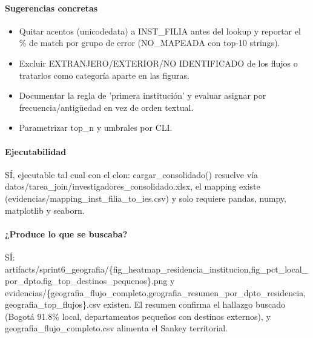 \paragraph{Sugerencias concretas}
\begin{itemize}
  \item Quitar acentos (unicodedata) a INST\_FILIA antes del lookup y reportar el \% de match por grupo de error (NO\_MAPEADA con top-10 strings).
  \item Excluir EXTRANJERO/EXTERIOR/NO IDENTIFICADO de los flujos o tratarlos como categoría aparte en las figuras.
  \item Documentar la regla de 'primera institución' y evaluar asignar por frecuencia/antigüedad en vez de orden textual.
  \item Parametrizar top\_n y umbrales por CLI.
\end{itemize}

\paragraph{Ejecutabilidad}
SÍ, ejecutable tal cual con el clon: cargar\_consolidado() resuelve vía datos/tarea\_join/investigadores\_consolidado.xlsx, el mapping existe (evidencias/mapping\_inst\_filia\_to\_ies.csv) y solo requiere pandas, numpy, matplotlib y seaborn.

\paragraph{¿Produce lo que se buscaba?}
SÍ: artifacts/sprint6\_geografia/\{fig\_heatmap\_residencia\_institucion,fig\_pct\_local\_por\_dpto,fig\_top\_destinos\_pequenos\}.png y evidencias/\{geografia\_flujo\_completo,geografia\_resumen\_por\_dpto\_residencia,geografia\_top\_flujos\}.csv existen. El resumen confirma el hallazgo buscado (Bogotá 91.8\% local, departamentos pequeños con destinos externos), y geografia\_flujo\_completo.csv alimenta el Sankey territorial.

